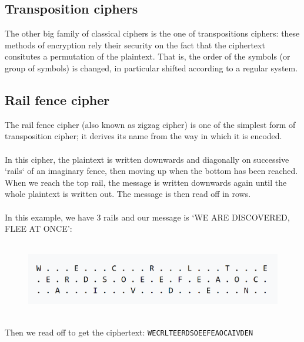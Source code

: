 \documentclass[Lau,binding=0.6cm,oneside]{sapthesis}
\begin{document}
\begin{appendices}
\chapter{Transposition ciphers}
The other big family of classical ciphers is the one of transpositions ciphers: these methods of encryption rely their security on the fact that the ciphertext consitutes a permutation of the plaintext. That is, the order of the symbols (or group of symbols) is changed, in particular shifted according to a regular system.

\section{Rail fence cipher}
The rail fence cipher (also known as zigzag cipher) is one of the simplest form of transposition cipher; it derives its name from the way in which it is encoded.\\\\
In this cipher, the plaintext is written downwards and diagonally on successive `rails` of an imaginary fence, then moving up when the bottom has been reached. When we reach the top rail, the message is written downwards again until the whole plaintext is written out. The message is then read off in rows.\\\\
In this example, we have 3 rails and our message is `\textsf{WE ARE DISCOVERED, FLEE AT ONCE}':\\\\

\begin{figure}[H]
\includegraphics[scale=0.42]{rail_fence}
\centering
\caption{}
\centering
\end{figure}
\ \\
Then we read off to get the ciphertext: \colorbox{gray!12}{\small{\texttt{WECRLTEERDSOEEFEAOCAIVDEN}}}\\\\


\end{appendices}
\end{document}
